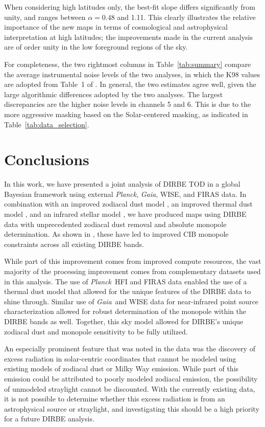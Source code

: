 \documentclass{aa}
\def\Planck{\textit{Planck}}
\def\Gaia{\textit{Gaia}}
\begin{document}
When considering high latitudes only, the best-fit slope differs
significantly from unity, and ranges between $\alpha=0.48$ and
1.11. This clearly illustrates the relative importance of the new maps
in terms of cosmological and astrophysical interpretation at high
latitudes; the improvements made in the current analysis are of order
unity in the low foreground regions of the sky. 

For completeness, the two rightmost columns in Table~\ref{tab:summary}
compare the average instrumental noise levels of the two analyses,
in which the K98 values are adopted from Table~1 of
\citet{hauser1998}. In general, the two estimates agree well, given
the large algorithmic differences adopted by the two analyses.
{The largest discrepancies are the higher noise levels in channels 5 and 6. This is due to the more aggressive masking based on the Solar-centered masking, as indicated in Table~\ref{tab:data_selection}.}




\section{Conclusions}
\label{sec:conclusions}

In this work, we have presented a joint analysis of DIRBE TOD in a global Bayesian framework using external \Planck, \Gaia, WISE, and FIRAS data. In combination with an improved zodiacal dust model \citep{CG02_02}, an improved thermal dust model \citep{CG02_05,CG02_06,CG02_07}, and an infrared stellar model \citep{CG02_04}, we have produced maps using DIRBE data with unprecedented zodiacal dust removal and absolute monopole determination. As shown in \citet{CG02_03}, these have led to improved CIB monopole constraints across all existing DIRBE bands.

While part of this improvement comes from improved compute resources, the vast majority of the processing improvement comes from complementary datasets used in this analysis. The use of \Planck\ HFI and FIRAS data enabled the use of a thermal dust model that allowed for the unique features of the DIRBE data to shine through. Similar use of \Gaia\ and WISE data for near-infrared point source characterization allowed for robust determination of the monopole within the DIRBE bands as well. Together, this sky model allowed for DIRBE's unique zodiacal dust and monopole sensitivity to be fully utilized.

An especially prominent feature that was noted in the data was the discovery of excess radiation in solar-centric coordinates that cannot be modeled using existing models of zodiacal dust or Milky Way emission. While part of this emission could be attributed to poorly modeled zodiacal emission, the possibility of unmodeled straylight cannot be discounted. With the currently existing data, it is not possible to determine whether this excess radiation is from an astrophysical source or straylight, and investigating this should be a high priority for a future DIRBE analysis.
\end{document}
